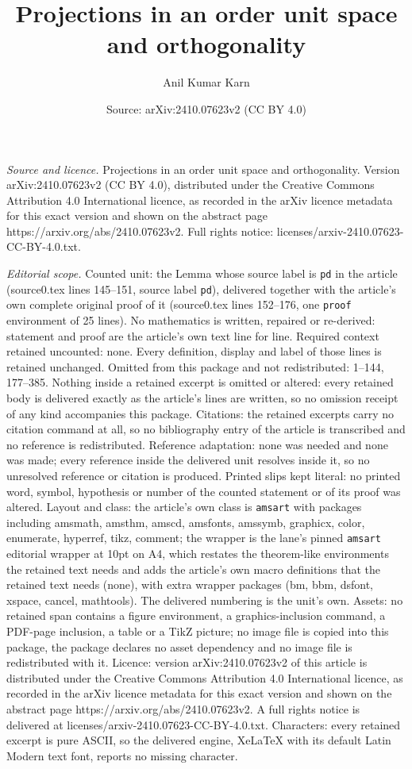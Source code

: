 \documentclass[10pt,a4paper]{amsart}
\title[Projections in an order unit space and orthogonality]{Projections in an order unit space and orthogonality}
\author{Anil Kumar Karn}
\date{Source: arXiv:2410.07623v2 (CC BY 4.0)}
\begin{document}
\maketitle

\noindent\emph{Source and licence.} Projections in an order unit space and orthogonality. Version arXiv:2410.07623v2 (CC BY 4.0), distributed under the Creative Commons Attribution 4.0 International licence, as recorded in the arXiv licence metadata for this exact version and shown on the abstract page https://arxiv.org/abs/2410.07623v2. Full rights notice: licenses/arxiv-2410.07623-CC-BY-4.0.txt.\par\smallskip

\noindent\textit{Editorial scope.} Counted unit: the Lemma whose source label is \texttt{pd} in the article (source0.tex lines 145--151, source label \texttt{pd}), delivered together with the article's own complete original proof of it (source0.tex lines 152--176, one \texttt{proof} environment of 25 lines). No mathematics is written, repaired or re-derived: statement and proof are the article's own text line for line. Required context retained uncounted: none. Every definition, display and label of those lines is retained unchanged. Omitted from this package and not redistributed: 1--144, 177--385. Nothing inside a retained excerpt is omitted or altered: every retained body is delivered exactly as the article's lines are written, so no omission receipt of any kind accompanies this package. Citations: the retained excerpts carry no citation command at all, so no bibliography entry of the article is transcribed and no reference is redistributed. Reference adaptation: none was needed and none was made; every reference inside the delivered unit resolves inside it, so no unresolved reference or citation is produced. Printed slips kept literal: no printed word, symbol, hypothesis or number of the counted statement or of its proof was altered. Layout and class: the article's own class is \texttt{amsart} with packages including amsmath, amsthm, amscd, amsfonts, amssymb, graphicx, color, enumerate, hyperref, tikz, comment; the wrapper is the lane's pinned \texttt{amsart} editorial wrapper at 10pt on A4, which restates the theorem-like environments the retained text needs and adds the article's own macro definitions that the retained text needs (none), with extra wrapper packages (bm, bbm, dsfont, xspace, cancel, mathtools). The delivered numbering is the unit's own. Assets: no retained span contains a figure environment, a graphics-inclusion command, a PDF-page inclusion, a table or a TikZ picture; no image file is copied into this package, the package declares no asset dependency and no image file is redistributed with it. Licence: version arXiv:2410.07623v2 of this article is distributed under the Creative Commons Attribution 4.0 International licence, as recorded in the arXiv licence metadata for this exact version and shown on the abstract page https://arxiv.org/abs/2410.07623v2. A full rights notice is delivered at licenses/arxiv-2410.07623-CC-BY-4.0.txt. Characters: every retained excerpt is pure ASCII, so the delivered engine, XeLaTeX with its default Latin Modern text font, reports no missing character.
\end{document}
